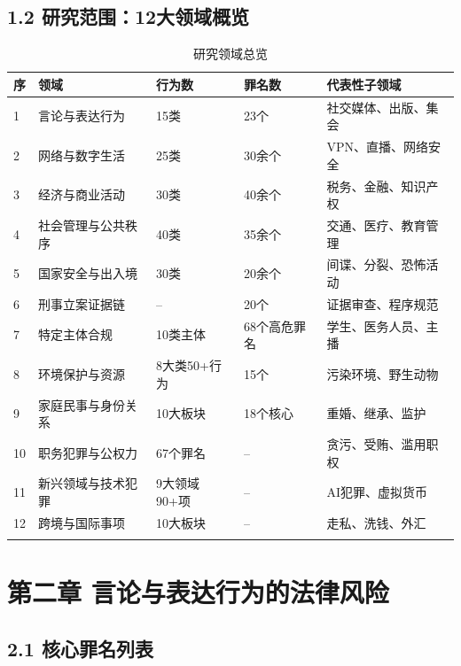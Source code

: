 \documentclass[12pt,a4paper]{article}
\begin{document}
\subsection{1.2 研究范围：12大领域概览}

\begin{longtable}{p{0.8cm}p{3cm}p{2cm}p{2cm}p{5cm}}
  \toprule
  \textbf{序} & \textbf{领域} & \textbf{行为数} & \textbf{罪名数} & \textbf{代表性子领域} \\
  \midrule
  1 & 言论与表达行为 & 15类 & 23个 & 社交媒体、出版、集会 \\
  2 & 网络与数字生活 & 25类 & 30余个 & VPN、直播、网络安全 \\
  3 & 经济与商业活动 & 30类 & 40余个 & 税务、金融、知识产权 \\
  4 & 社会管理与公共秩序 & 40类 & 35余个 & 交通、医疗、教育管理 \\
  5 & 国家安全与出入境 & 30类 & 20余个 & 间谍、分裂、恐怖活动 \\
  6 & 刑事立案证据链 & -- & 20个 & 证据审查、程序规范 \\
  7 & 特定主体合规 & 10类主体 & 68个高危罪名 & 学生、医务人员、主播 \\
  8 & 环境保护与资源 & 8大类50+行为 & 15个 & 污染环境、野生动物 \\
  9 & 家庭民事与身份关系 & 10大板块 & 18个核心 & 重婚、继承、监护 \\
  10 & 职务犯罪与公权力 & 67个罪名 & -- & 贪污、受贿、滥用职权 \\
  11 & 新兴领域与技术犯罪 & 9大领域90+项 & -- & AI犯罪、虚拟货币 \\
  12 & 跨境与国际事项 & 10大板块 & -- & 走私、洗钱、外汇 \\
  \bottomrule
  \caption{研究领域总览}
\end{longtable}

\clearpage

\section{第二章 言论与表达行为的法律风险}

\subsection{2.1 核心罪名列表}
\end{document}
